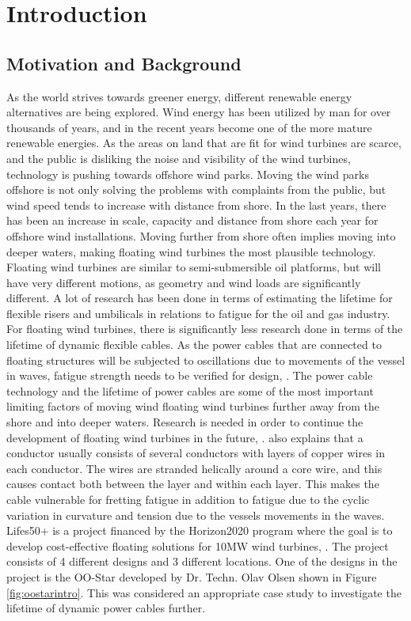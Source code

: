 \chapter{Introduction}
\label{chap:introduction}
\section{Motivation and Background}
As the world strives towards greener energy, different renewable energy alternatives are being explored. Wind energy has been utilized by man for over thousands of years, and in the recent years become one of the more mature renewable energies. As the areas on land that are fit for wind turbines are scarce, and the public is disliking the noise and visibility of the wind turbines, technology is pushing towards offshore wind parks. Moving the wind parks offshore is not only solving the problems with complaints from the public, but wind speed tends to increase with distance from shore. In the last years, there has been an increase in scale, capacity and distance from shore each year for offshore wind installations. Moving further from shore often implies moving into deeper waters, making floating wind turbines the most plausible technology. Floating wind turbines are similar to semi-submersible oil platforms, but will have very different motions, as geometry and wind loads are significantly different. A lot of research has been done in terms of estimating the lifetime for flexible risers and umbilicals in relations to fatigue for the oil and gas industry. For floating wind turbines, there is significantly less research done in terms of the lifetime of dynamic flexible cables. As the power cables that are connected to floating structures will be subjected to oscillations due to movements of the vessel in waves, fatigue strength needs to be verified for design, \cite{Savik2014}.   The power cable technology and the lifetime of power cables are some of the most important limiting factors of moving wind floating wind turbines further away from the shore and into deeper waters. Research is needed in order to continue the development of floating wind turbines in the future, \cite{Thies2012}. \cite{savik2014} also explains that a conductor usually consists of several conductors with layers of copper wires in each conductor. The wires are stranded helically around a core wire, and this causes contact both between the layer and within each layer. This makes the cable vulnerable for fretting fatigue in addition to fatigue due to the cyclic variation in curvature and tension due to the vessels movements in the waves.  \newline
\newline
Lifes50+ is a project financed by the Horizon2020 program where the goal is to develop cost-effective floating solutions for 10MW wind turbines, \cite{Horizon2010}. The project consists of 4 different designs and 3 different locations. One of the designs in the project is the OO-Star developed by Dr. Techn. Olav Olsen shown in Figure \ref{fig:oostarintro}. This was considered an appropriate case study to investigate the lifetime of dynamic power cables further.

